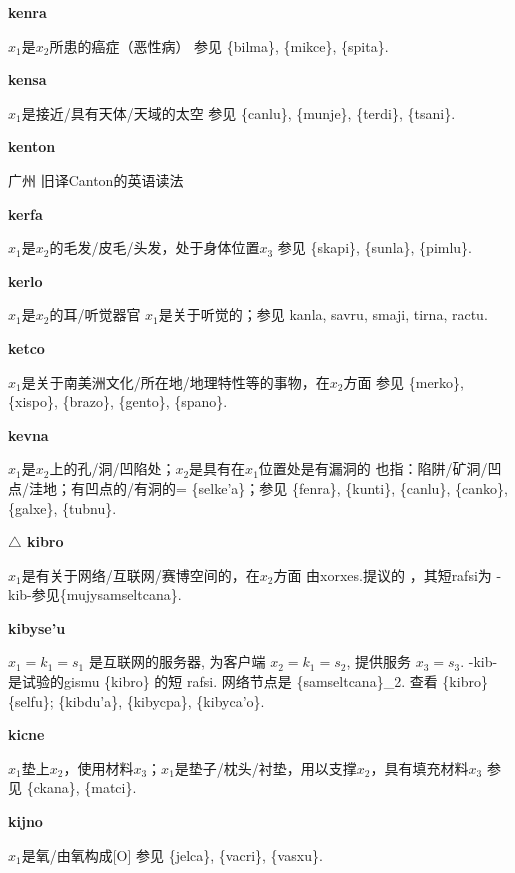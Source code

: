 \documentclass[notitlepage,twocolumn,a4paper,10pt]{book}
\begin{document}
{\sffamily\bfseries kenra}\enspace {\ttfamily\bfseries[ken]}  $x_1$是$x_2$所患的癌症（恶性病） \textemdash{} 参见 \{bilma\}, \{mikce\}, \{spita\}.

{\sffamily\bfseries kensa}\enspace {\ttfamily\bfseries[kes]}  $x_1$是接近\slash{}具有天体\slash{}天域的太空 \textemdash{} 参见 \{canlu\}, \{munje\}, \{terdi\}, \{tsani\}.

{\sffamily\bfseries kenton} 广州 \textemdash{} 旧译Canton的英语读法

{\sffamily\bfseries kerfa}\enspace {\ttfamily\bfseries[    kre]}  $x_1$是$x_2$的毛发\slash{}皮毛\slash{}头发，处于身体位置$x_3$ \textemdash{} 参见 \{skapi\}, \{sunla\}, \{pimlu\}.

{\sffamily\bfseries kerlo}\enspace {\ttfamily\bfseries[ker]}  $x_1$是$x_2$的耳\slash{}听觉器官 \textemdash{} $x_1$是关于听觉的；参见 {kanla}, {savru}, {smaji}, {tirna}, {ractu}.

{\sffamily\bfseries ketco}  $x_1$是关于南美洲文化\slash{}所在地\slash{}地理特性等的事物，在$x_2$方面 \textemdash{} 参见 \{merko\}, \{xispo\}, \{brazo\}, \{gento\}, \{spano\}.

{\sffamily\bfseries kevna}\enspace {\ttfamily\bfseries[kev     ke'a]}  $x_1$是$x_2$上的孔\slash{}洞\slash{}凹陷处；$x_2$是具有在$x_1$位置处是有漏洞的 \textemdash{} 也指：陷阱\slash{}矿洞\slash{}凹点\slash{}洼地；有凹点的\slash{}有洞的= \{selke'a\}；参见 \{fenra\}, \{kunti\}, \{canlu\}, \{canko\}, \{galxe\}, \{tubnu\}.

{\sffamily\bfseries $\triangle$ kibro} $x_1$是有关于网络\slash{}互联网\slash{}赛博空间的，在$x_2$方面 \textemdash{} 由xorxes.提议的 ，其短rafsi为 -kib-参见\{mujysamseltcana\}.

{\sffamily\bfseries kibyse'u} $x_1=k_1=s_1$ 是互联网的服务器, 为客户端 $x_2=k_1=s_2$, 提供服务 $x_3=s_3$. \textemdash{} -kib- 是试验的gismu \{kibro\} 的短 rafsi. 网络节点是 \{samseltcana\}\_2. 查看 \{kibro\} \{selfu\}; \{kibdu'a\}, \{kibycpa\}, \{kibyca'o\}.

{\sffamily\bfseries kicne}\enspace {\ttfamily\bfseries[kic     ki'e]}  $x_1$垫上$x_2$，使用材料$x_3$；$x_1$是垫子\slash{}枕头\slash{}衬垫，用以支撑$x_2$，具有填充材料$x_3$ \textemdash{} 参见 \{ckana\}, \{matci\}.

{\sffamily\bfseries kijno}\enspace {\ttfamily\bfseries[kij]}  $x_1$是氧\slash{}由氧构成[O] \textemdash{} 参见 \{jelca\}, \{vacri\}, \{vasxu\}.
\end{document}
